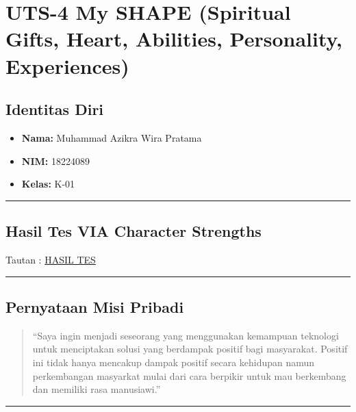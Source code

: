 \documentclass[
  letterpaper,
  DIV=11,
  numbers=noendperiod]{scrreprt}
\providecommand{\tightlist}{%
  \setlength{\itemsep}{0pt}\setlength{\parskip}{0pt}}
\begin{document}

\chapter{UTS-4 My SHAPE (Spiritual Gifts, Heart, Abilities, Personality,
Experiences)}\label{uts-4-my-shape-spiritual-gifts-heart-abilities-personality-experiences}

\section{Identitas Diri}\label{identitas-diri-1}

\begin{itemize}
\tightlist
\item
  \textbf{Nama:} Muhammad Azikra Wira Pratama\\
\item
  \textbf{NIM:} 18224089
\item
  \textbf{Kelas:} K-01
\end{itemize}

\begin{center}\rule{0.5\linewidth}{0.5pt}\end{center}

\section{Hasil Tes VIA Character
Strengths}\label{hasil-tes-via-character-strengths}

Tautan : \href{StrengthsProfile-MuhammadAzikra-WiraPratama.pdf}{HASIL
TES}

\begin{center}\rule{0.5\linewidth}{0.5pt}\end{center}

\section{Pernyataan Misi Pribadi}\label{pernyataan-misi-pribadi}

\begin{quote}
``Saya ingin menjadi seseorang yang menggunakan kemampuan teknologi
untuk menciptakan solusi yang berdampak positif bagi masyarakat. Positif
ini tidak hanya mencakup dampak positif secara kehidupan namun
perkembangan masyarkat mulai dari cara berpikir untuk mau berkembang dan
memiliki rasa manusiawi.''
\end{quote}

\begin{center}\rule{0.5\linewidth}{0.5pt}\end{center}
\end{document}
